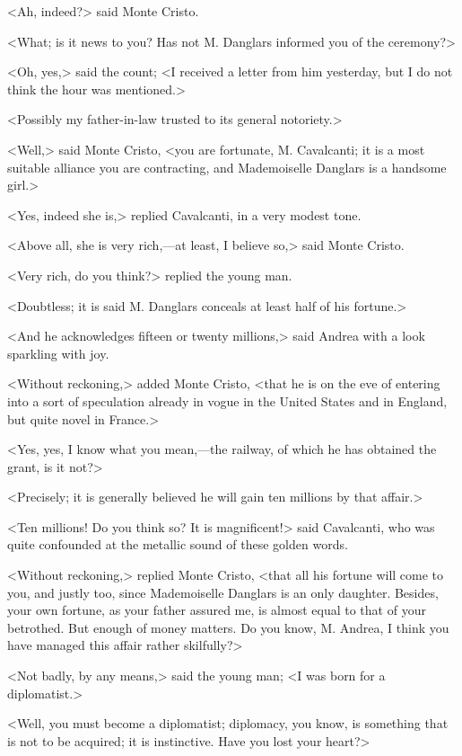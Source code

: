  <Ah, indeed?> said Monte Cristo. 

 <What; is it news to you? Has not M. Danglars informed you of the ceremony?> 

 <Oh, yes,> said the count; <I received a letter from him yesterday, but I do not think the hour was mentioned.> 

 <Possibly my father-in-law trusted to its general notoriety.> 

 <Well,> said Monte Cristo, <you are fortunate, M. Cavalcanti; it is a most suitable alliance you are contracting, and Mademoiselle Danglars is a handsome girl.> 

 <Yes, indeed she is,> replied Cavalcanti, in a very modest tone. 

 <Above all, she is very rich,—at least, I believe so,> said Monte Cristo. 

 <Very rich, do you think?> replied the young man. 

 <Doubtless; it is said M. Danglars conceals at least half of his fortune.> 

 <And he acknowledges fifteen or twenty millions,> said Andrea with a look sparkling with joy. 

 <Without reckoning,> added Monte Cristo, <that he is on the eve of entering into a sort of speculation already in vogue in the United States and in England, but quite novel in France.> 

 <Yes, yes, I know what you mean,—the railway, of which he has obtained the grant, is it not?> 

 <Precisely; it is generally believed he will gain ten millions by that affair.> 

 <Ten millions! Do you think so? It is magnificent!> said Cavalcanti, who was quite confounded at the metallic sound of these golden words. 

 <Without reckoning,> replied Monte Cristo, <that all his fortune will come to you, and justly too, since Mademoiselle Danglars is an only daughter. Besides, your own fortune, as your father assured me, is almost equal to that of your betrothed. But enough of money matters. Do you know, M. Andrea, I think you have managed this affair rather skilfully?> 

 <Not badly, by any means,> said the young man; <I was born for a diplomatist.> 

 <Well, you must become a diplomatist; diplomacy, you know, is something that is not to be acquired; it is instinctive. Have you lost your heart?> 

